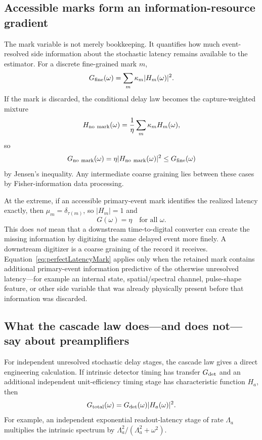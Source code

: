 \subsection{Accessible marks form an information-resource gradient}
\label{sec:markGradient}

The mark variable is not merely bookkeeping. It quantifies how much event-resolved side information about the stochastic latency remains available to the estimator. For a discrete fine-grained mark $m$,
\begin{equation}
G_{\rm fine}(\omega)=\sum_m\kappa_m|H_m(\omega)|^2.
\end{equation}
If the mark is discarded, the conditional delay law becomes the capture-weighted mixture
\begin{equation}
H_{\rm no\ mark}(\omega)
=\frac{1}{\eta}\sum_m\kappa_mH_m(\omega),
\end{equation}
so
\begin{equation}
G_{\rm no\ mark}(\omega)
=\eta|H_{\rm no\ mark}(\omega)|^2
\le G_{\rm fine}(\omega)
\label{eq:markJensen}
\end{equation}
by Jensen's inequality. Any intermediate coarse graining lies between these cases by Fisher-information data processing.

At the extreme, if an accessible primary-event mark identifies the realized latency exactly, then $\mu_m=\delta_{\tau(m)}$, so $|H_m|=1$ and
\begin{equation}
\boxed{G(\omega)=\eta\quad\text{for all }\omega.}
\label{eq:perfectLatencyMark}
\end{equation}
This does \emph{not} mean that a downstream time-to-digital converter can create the missing information by digitizing the same delayed event more finely. A downstream digitizer is a coarse graining of the record it receives. Equation~\eqref{eq:perfectLatencyMark} applies only when the retained mark contains additional primary-event information predictive of the otherwise unresolved latency---for example an internal state, spatial/spectral channel, pulse-shape feature, or other side variable that was already physically present before that information was discarded.

\subsection{What the cascade law does---and does not---say about preamplifiers}
\label{sec:preampCaution}

For independent unresolved stochastic delay stages, the cascade law gives a direct engineering calculation. If intrinsic detector timing has transfer $G_{\rm det}$ and an additional independent unit-efficiency timing stage has characteristic function $H_a$, then
\begin{equation}
G_{\rm total}(\omega)=G_{\rm det}(\omega)|H_a(\omega)|^2.
\label{eq:stochasticReadoutCascade}
\end{equation}
For example, an independent exponential readout-latency stage of rate $\Lambda_a$ multiplies the intrinsic spectrum by $\Lambda_a^2/(\Lambda_a^2+\omega^2)$.

